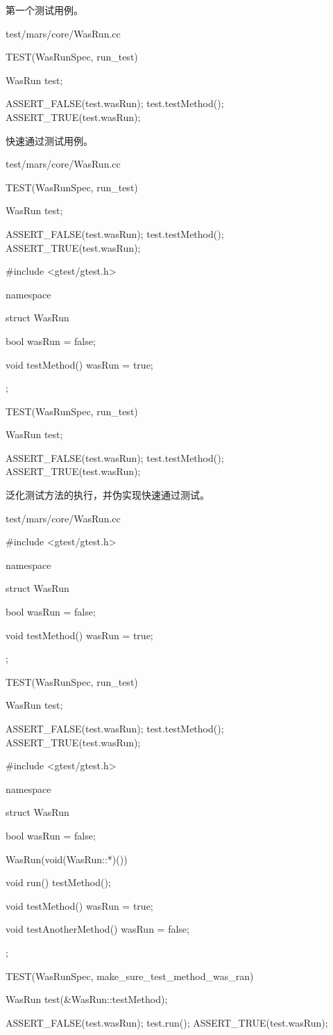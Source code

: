 
第一个测试用例。

\begin{nodiff}{test/mars/core/WasRun.cc}
\begin{c++}
TEST(WasRunSpec, run_test) {
  WasRun test;

  ASSERT_FALSE(test.wasRun);
  test.testMethod();
  ASSERT_TRUE(test.wasRun);
}
\end{c++}
\end{nodiff}

快速通过测试用例。

\begin{diff}{test/mars/core/WasRun.cc}
\begin{minicpp}
TEST(WasRunSpec, run_test) {
  WasRun test;

  ASSERT_FALSE(test.wasRun);
  test.testMethod();
  ASSERT_TRUE(test.wasRun);
}
\end{minicpp}
\tcblower
\begin{minicpp}
#include <gtest/gtest.h>

namespace {
  struct WasRun {
    bool wasRun = false;

    void testMethod() {
      wasRun = true;
    }
  };
}

TEST(WasRunSpec, run_test) {
  WasRun test;

  ASSERT_FALSE(test.wasRun);
  test.testMethod();
  ASSERT_TRUE(test.wasRun);
}
\end{minicpp}
\end{diff}

泛化测试方法的执行，并伪实现快速通过测试。

\begin{diff}{test/mars/core/WasRun.cc}
\begin{minicpp}
#include <gtest/gtest.h>

namespace {
  struct WasRun {
    bool wasRun = false;

    void testMethod() {
      wasRun = true;
    }
  };
}

TEST(WasRunSpec, run_test) {
  WasRun test;

  ASSERT_FALSE(test.wasRun);
  test.testMethod();
  ASSERT_TRUE(test.wasRun);
}\end{minicpp}
\tcblower
\begin{minicpp}
#include <gtest/gtest.h>

namespace {
  struct WasRun {
    bool wasRun = false;

    WasRun(void(WasRun::*)()) {
    }

    void run() {
      testMethod();
    }

    void testMethod() {
      wasRun = true;
    }

    void testAnotherMethod() {
      wasRun = false;
    }
  };
}

TEST(WasRunSpec, make_sure_test_method_was_ran) {
  WasRun test(&WasRun::testMethod);

  ASSERT_FALSE(test.wasRun);
  test.run();
  ASSERT_TRUE(test.wasRun);
}
\end{minicpp}
\end{diff}

